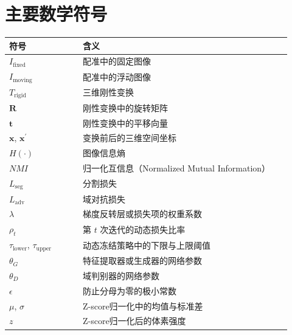 \section{主要数学符号}
\begin{longtable}{p{0.24\linewidth}p{0.68\linewidth}}
  \toprule
  符号 & 含义 \\
  \midrule
  $I_{\mathrm{fixed}}$ & 配准中的固定图像 \\
  $I_{\mathrm{moving}}$ & 配准中的浮动图像 \\
  $T_{\mathrm{rigid}}$ & 三维刚性变换 \\
  $\mathbf{R}$ & 刚性变换中的旋转矩阵 \\
  $\mathbf{t}$ & 刚性变换中的平移向量 \\
  $\mathbf{x}$, $\mathbf{x}^{\prime}$ & 变换前后的三维空间坐标 \\
  $H(\cdot)$ & 图像信息熵 \\
  $NMI$ & 归一化互信息（Normalized Mutual Information） \\
  $L_{\mathrm{seg}}$ & 分割损失 \\
  $L_{\mathrm{adv}}$ & 域对抗损失 \\
  $\lambda$ & 梯度反转层或损失项的权重系数 \\
  $\rho_t$ & 第 $t$ 次迭代的动态损失比率 \\
  $\tau_{\mathrm{lower}}$, $\tau_{\mathrm{upper}}$ & 动态冻结策略中的下限与上限阈值 \\
  $\theta_G$ & 特征提取器或生成器的网络参数 \\
  $\theta_D$ & 域判别器的网络参数 \\
  $\epsilon$ & 防止分母为零的极小常数 \\
  $\mu$, $\sigma$ & Z-score归一化中的均值与标准差 \\
  $z$ & Z-score归一化后的体素强度 \\
  \bottomrule
\end{longtable}
